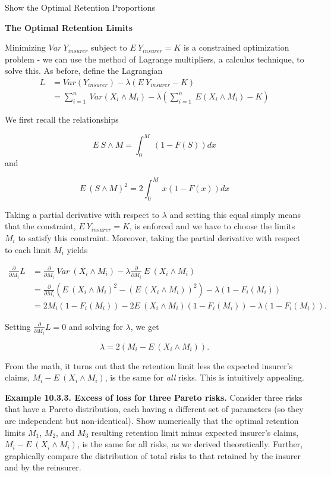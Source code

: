 \documentclass[]{book}
\theoremstyle{definition}
\theoremstyle{definition}
\theoremstyle{definition}
\theoremstyle{remark}
\begin{document}
Show the Optimal Retention Proportions

\hypertarget{toggleDerivationProofExcess}{}
\textbf{The Optimal Retention Limits}

Minimizing \(Var ~Y_{insurer}\) subject to \(E ~Y_{insurer} = K\) is a
constrained optimization problem - we can use the method of Lagrange
multipliers, a calculus technique, to solve this. As before, define the
Lagrangian \[
\begin{array}{ll}
L &= Var (Y_{insurer}) - \lambda (E ~Y_{insurer} - K) \\
&= \sum_{i=1}^n ~Var (X_i \wedge M_i) - \lambda (\sum_{i=1}^n ~E(X_i \wedge M_i)- K) 
\end{array}
\]

We first recall the relationships

\[
E~S \wedge M = \int_0^M ~(1- F(S))dx
\] and

\[
E~(S \wedge M)^2 = 2\int_0^M ~x(1- F(x))dx
\]

Taking a partial derivative with respect to \(\lambda\) and setting this
equal simply means that the constraint, \(E ~Y_{insurer} = K\), is
enforced and we have to choose the limits \(M_i\) to satisfy this
constraint. Moreover, taking the partial derivative with respect to each
limit \(M_i\) yields

\[
\begin{array}{ll}
\frac{\partial}{\partial M_i} L 
&= \frac{\partial}{\partial M_i}  ~Var~ (X_i \wedge M_i)  - \lambda \frac{\partial}{\partial M_i} ~E ~(X_i \wedge M_i) \\
&= \frac{\partial}{\partial M_i} \left(E~ (X_i \wedge M_i)^2 -(E ~(X_i \wedge M_i))^2\right) - \lambda (1-F_i(M_i)) \\
&= 2 M_i (1-F_i(M_i)) - 2 E ~(X_i \wedge M_i) (1-F_i(M_i))-
\lambda (1-F_i(M_i)).
\end{array}
\]

Setting \(\frac{\partial}{\partial M_i} L =0\) and solving for
\(\lambda\), we get

\[
\lambda = 2 (M_i - E ~(X_i \wedge M_i)) .
\]

From the math, it turns out that the retention limit less the expected
insurer's claims, \(M_i - E ~(X_i \wedge M_i)\), is the same for
\emph{all} risks. This is intuitively appealing.

\textbf{Example 10.3.3. Excess of loss for three Pareto risks.} Consider
three risks that have a Pareto distribution, each having a different set
of parameters (so they are independent but non-identical). Show
numerically that the optimal retention limits \(M_1\), \(M_2\), and
\(M_3\) resulting retention limit minus expected insurer's claims,
\(M_i - E ~(X_i \wedge M_i)\), is the same for all risks, as we derived
theoretically. Further, graphically compare the distribution of total
risks to that retained by the insurer and by the reinsurer.
\end{document}
